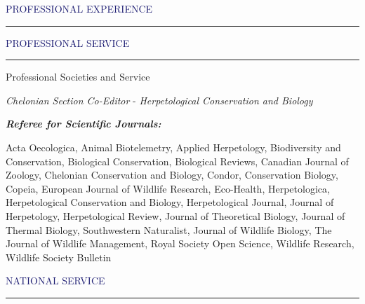 \documentclass{resume} %
\renewenvironment{rSection}[1]{
\sectionskip
\textcolor{MidnightBlue}{\MakeUppercase{#1}}
\sectionlineskip
\hrule
\begin{list}{}{
\setlength{\leftmargin}{1.5em}
}
\item[]
}{
\end{list}
}
\begin{document}
\begin{rSection}{Professional Experience}
\begin{rSection}{Professional Service}

\begin{rSubsection}{Professional Societies and Service}{}{}{}

\item \textit{Chelonian Section Co-Editor} - \textit{Herpetological Conservation and Biology}

\textbf{\textit{Referee for Scientific Journals:}}

Acta Oecologica, Animal Biotelemetry, Applied Herpetology, Biodiversity and Conservation, Biological Conservation, Biological Reviews, Canadian Journal of Zoology, Chelonian Conservation and Biology,
Condor, Conservation Biology, Copeia, European Journal of Wildlife Research, Eco-Health, Herpetologica, Herpetological Conservation and Biology, Herpetological Journal, Journal of Herpetology, Herpetological Review, Journal of Theoretical Biology, Journal of Thermal Biology, Southwestern Naturalist, Journal of Wildlife Biology, The Journal of Wildlife Management, Royal Society Open Science, Wildlife Research, Wildlife Society Bulletin \\

\end{rSubsection}
\begin{rSection}{National Service}


\end{rSection}
\end{rSection}
\end{rSection}
\end{document}
